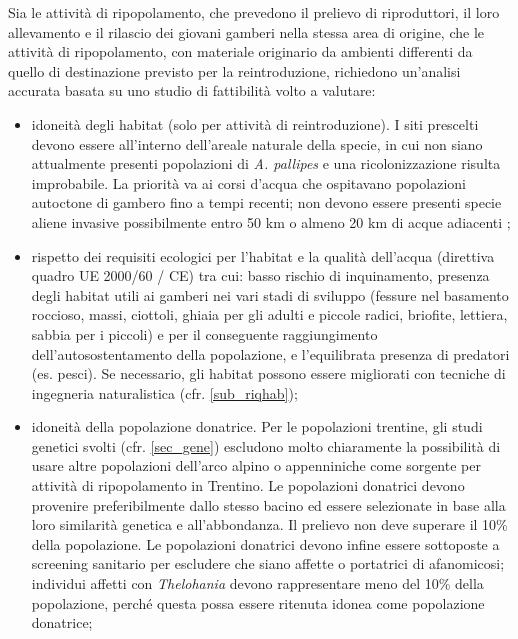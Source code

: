 \documentclass[11pt,a4paper,italian,twoside,openany]{memoir}
\begin{document}
Sia le attività di ripopolamento, che prevedono il prelievo di riproduttori, il loro allevamento e il rilascio dei giovani gamberi nella stessa area di origine, che le attività di ripopolamento, con materiale originario da ambienti differenti da quello di destinazione previsto per la reintroduzione, richiedono un'analisi accurata basata su uno studio di fattibilità \cite{Souty-Grosset 2009} volto a valutare:
\begin{itemize}
  \item idoneità degli habitat (solo per attività di reintroduzione). I siti prescelti devono essere all'interno dell'areale naturale della specie, in cui non siano attualmente presenti popolazioni di \emph{A. pallipes} e una ricolonizzazione risulta improbabile. La priorità va ai corsi d'acqua che ospitavano popolazioni autoctone di gambero fino a tempi recenti; non devono essere presenti specie aliene invasive possibilmente entro 50 km o almeno 20 km di acque adiacenti \cite{Peay 2003} \cite{Souty-Grosset 2009};
  \item rispetto dei requisiti ecologici per l'habitat e la qualità dell'acqua (direttiva quadro UE 2000/60 / CE) tra cui: basso rischio di inquinamento, presenza degli habitat utili ai gamberi nei vari stadi di sviluppo (fessure nel basamento roccioso, massi, ciottoli, ghiaia per gli adulti e piccole radici, briofite, lettiera, sabbia per i piccoli) e per il conseguente raggiungimento dell'autosostentamento della popolazione, e l'equilibrata presenza di predatori (es. pesci). Se necessario, gli habitat possono essere migliorati con tecniche di ingegneria naturalistica (cfr. \ref{sub_riqhab});
  \item idoneità della popolazione donatrice. Per le popolazioni trentine, gli studi genetici svolti (cfr. \ref{sec_gene}) escludono molto chiaramente la possibilità di usare altre popolazioni dell'arco alpino o appenniniche come sorgente per attività di ripopolamento in Trentino. Le popolazioni donatrici devono provenire preferibilmente dallo stesso bacino ed essere selezionate in base alla loro similarità genetica e all'abbondanza. Il prelievo non deve superare il 10\% della popolazione. Le popolazioni donatrici devono infine essere sottoposte a screening sanitario per escludere che siano affette o portatrici di afanomicosi; individui affetti con \emph{Thelohania} devono rappresentare meno del 10\% della popolazione, perché questa possa essere ritenuta idonea come popolazione donatrice;

\end{itemize}
\end{document}
